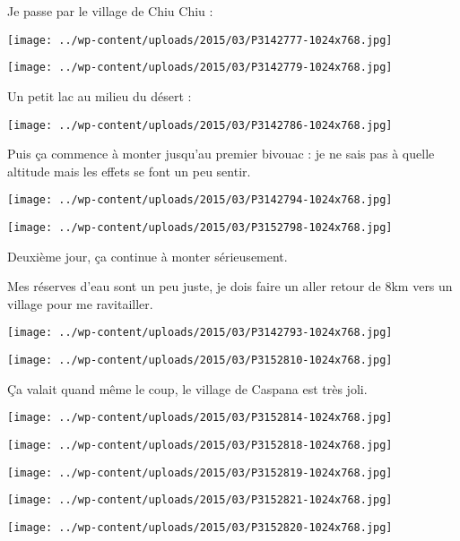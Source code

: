 \pagebreak
Je passe par le village de Chiu Chiu :
\begin{center} \texttt{[image: ../wp-content/uploads/2015/03/P3142777-1024x768.jpg]} \end{center}
\begin{center} \texttt{[image: ../wp-content/uploads/2015/03/P3142779-1024x768.jpg]} \end{center}

\pagebreak
Un petit lac au milieu du désert :
\begin{center} \texttt{[image: ../wp-content/uploads/2015/03/P3142786-1024x768.jpg]} \end{center}

Puis ça commence à monter jusqu'au premier bivouac : je ne sais pas à quelle altitude mais les effets se font un peu sentir.
\begin{center} \texttt{[image: ../wp-content/uploads/2015/03/P3142794-1024x768.jpg]} \end{center}
\begin{center} \texttt{[image: ../wp-content/uploads/2015/03/P3152798-1024x768.jpg]} \end{center}

 Deuxième jour, ça continue à monter sérieusement.

 Mes réserves d'eau sont un peu juste, je dois faire un aller retour de 8km vers un village pour me ravitailler. 
\begin{center} \texttt{[image: ../wp-content/uploads/2015/03/P3142793-1024x768.jpg]} \end{center}
\begin{center} \texttt{[image: ../wp-content/uploads/2015/03/P3152810-1024x768.jpg]} \end{center}

 Ça valait quand même le coup, le village de Caspana est très joli.
\begin{center} \texttt{[image: ../wp-content/uploads/2015/03/P3152814-1024x768.jpg]} \end{center}
\begin{center} \texttt{[image: ../wp-content/uploads/2015/03/P3152818-1024x768.jpg]} \end{center}
\begin{center} \texttt{[image: ../wp-content/uploads/2015/03/P3152819-1024x768.jpg]} \end{center}
\begin{center} \texttt{[image: ../wp-content/uploads/2015/03/P3152821-1024x768.jpg]} \end{center}
\begin{center} \texttt{[image: ../wp-content/uploads/2015/03/P3152820-1024x768.jpg]} \end{center}

